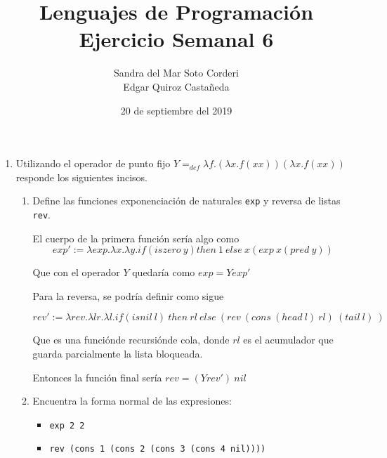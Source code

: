 \documentclass{article}
\begin{document}
    \title{
        Lenguajes de Programación \\
        Ejercicio Semanal 6
    }

    \author{
        Sandra del Mar Soto Corderi \\
        Edgar Quiroz Castañeda
    }

    \date{
        20 de septiembre del 2019
    }
    
    \maketitle

    \begin{enumerate}
        \item {
            Utilizando el operador de punto fijo 
            $Y =_{def} \lambda f.(\lambda x.f(xx))(\lambda x.f(xx))$ responde 
            los siguientes incisos.
            
            \begin{enumerate}
           
            	\item {
                    Define las funciones exponenciación de naturales \texttt{exp}
                    y reversa de listas \texttt{rev}.
                    
                    El cuerpo de la primera función sería algo como
                    \[
                        exp' := \lambda exp. \lambda x. \lambda y. 
                        if (iszero \ y) then \ 1 \ else \ x (exp \ x (pred \ y))
                    \]

                    Que con el operador $Y$ quedaría como $exp = Y exp'$

                    Para la reversa, se podría definir como sigue

                     \[
                         rev ' := \lambda rev. \lambda lr. \lambda l.
                         if (isnil \ l) \ then \ rl \ else \ (rev \ (cons \ (head \ l) \ rl)
                         \ (tail \ l) \ 
                         )
                     \]

                    Que es una funciónde recursiónde cola, donde $rl$ es el
                    acumulador que guarda parcialmente la lista bloqueada.

                    Entonces la función final sería $rev = (Yrev ') \ nil$
        		
        		}
        	
        	\item {
        		Encuentra la forma normal de las expresiones:
        		
        		\begin{itemize}
        			\item {
        			 \texttt{exp 2 2}
        			 
        			}
        		
        			\item {
        			\texttt{rev (cons 1 (cons 2 (cons 3 (cons 4 nil))))}
        			}
        		\end{itemize}
    		}
    	 \end{enumerate}
        }
    \end{enumerate}
\end{document}
